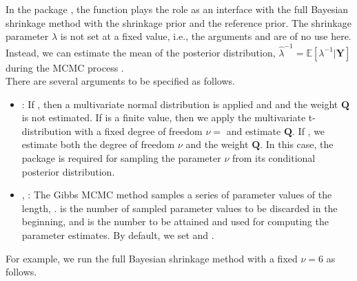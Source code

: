 \documentclass[
]{jss}
\begin{document}
In the package , the function
 plays the role as an
interface with the full Bayesian shrinkage method with the shrinkage
prior and the reference prior. The shrinkage parameter \(\lambda\) is
not set at a fixed value, i.e., the arguments  and
 are of no use here. Instead, we can estimate the mean
of the posterior distribution,
\(\hat{\lambda}^{-1} = \mathbb{E}\left[ \lambda^{-1} | \mathbf{Y} \right]\)
during the MCMC process \citep{Ni05}.\\
There are several arguments to be specified as follows.

\begin{itemize}
\item
  : If , then a multivariate normal
  distribution is applied and and the weight \(\mathbf{Q}\) is not
  estimated. If  is a finite value, then we apply the
  multivariate t-distribution with a fixed degree of freedom \(\nu=\)
   and estimate \(\mathbf{Q}\). If , we
  estimate both the degree of freedom \(\nu\) and the weight
  \(\mathbf{Q}\). In this case, the package  is required for
  sampling the parameter \(\nu\) from its conditional posterior
  distribution.
\item
  , : The Gibbs MCMC method samples a
  series of parameter values of the length,
  .  is the number of
  sampled parameter values to be discarded in the beginning, and
   is the number to be attained and used for computing
  the parameter estimates. By default, we set 
  and .
\end{itemize}

For example, we run the full Bayesian shrinkage method with a fixed
\(\nu = 6\) as follows.
\end{document}
